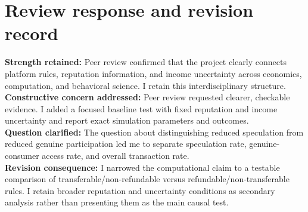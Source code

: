 \section{Review response and revision record}
\textbf{Strength retained:} Peer review confirmed that the project clearly connects platform rules, reputation information, and income uncertainty across economics, computation, and behavioral science. I retain this interdisciplinary structure.\\
\textbf{Constructive concern addressed:} Peer review requested clearer, checkable evidence. I added a focused baseline test with fixed reputation and income uncertainty and report exact simulation parameters and outcomes.\\
\textbf{Question clarified:} The question about distinguishing reduced speculation from reduced genuine participation led me to separate speculation rate, genuine-consumer access rate, and overall transaction rate.\\
\textbf{Revision consequence:} I narrowed the computational claim to a testable comparison of transferable/non-refundable versus refundable/non-transferable rules. I retain broader reputation and uncertainty conditions as secondary analysis rather than presenting them as the main causal test.

\clearpage\onecolumn
